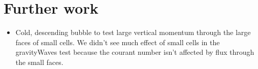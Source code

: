 \chapter{Further work}

\begin{itemize}
\item Cold, descending bubble to test large vertical momentum through the large faces of small cells.  We didn't see much effect of small cells in the gravityWaves test because the courant number isn't affected by flux through the small faces.
\end{itemize}
